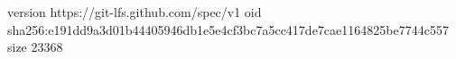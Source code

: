 version https://git-lfs.github.com/spec/v1
oid sha256:e191dd9a3d01b44405946db1e5e4cf3bc7a5cc417de7cae1164825be7744c557
size 23368
